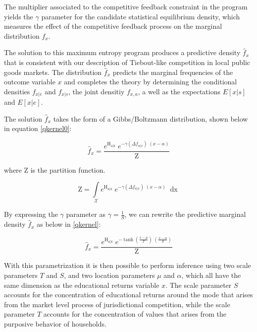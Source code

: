 \medskip


The multiplier associated to the competitive feedback constraint in the program
yields the $\gamma$ parameter for the candidate statistical
equilibrium density, which measures the effect of the competitive
feedback process on the marginal distribution $f_{x}$. 

The solution to this maximum entropy program produces a predictive
density $\hat{f}_{x}$ that is consistent with our 
description of Tiebout-like competition in local public goods
markets. The distribution $\hat{f}_{x}$ predicts the marginal
frequencies of the outcome variable $x$ and completes the theory by
determining the conditional densities $f_{x|e}$ and $f_{x|s}$, the
joint densitiy $f_{x,a}$, a well as the expectations $E[x|s]$ and
$E[x|e]$.

\medskip

The solution $\hat{f}_{x}$ takes the form of a Gibbs/Boltzmann
distribution, shown below in equation \ref{qkernel0}:

\medskip

\begin{equation} \label{qkernel0}
\hat{f}_{x}= \frac{e^{\operatorname{H_{a|x}}}\;e^{-\gamma\left(\Delta f_{a|x}\right)\;(x-\alpha)}}{\mathrm{Z}}
\end{equation}

\medskip


where $\mathrm{Z}$ is the partition function.

\medskip

\begin{equation} \label{partfunc}
\mathrm{Z} = \int \limits_{\mathcal{X}} e^{\operatorname{H_{a|x}}}\;e^{-\gamma\left(\Delta f_{a|x}\right)\;(x-\alpha)}\; \operatorname{dx}
\end{equation}

\medskip

By expressing the $\gamma$ parameter as $\gamma = \frac{1}{S}$, we can
rewrite the predictive marginal density $\hat{f}_{x}$ as below in
\ref{qkernel}:

\begin{equation} \label{qkernel}
\hat{f}_{x}= \frac{e^{\operatorname{H_{a|x}}}\;e^{-\operatorname{tanh}\left( \frac{x-\mu}{T}\right)\;\left(\frac{x-\alpha}{S}\right)}}{\mathrm{Z}}
\end{equation}

\medskip 

\medskip 

With this parametrization it is then possible to perform inference
using two scale parameters $T$ and $S$, and two location parameters
$\mu$ and $\alpha$, which all have the same dimension as the
educational returns variable $x$. The scale parameter $S$ accounts for
the concentration of educational returns around the mode that arises from the
market level process of jurisdictional competition, while the scale
parameter $T$ accounts for the concentration of values that arises
from the purposive behavior of households.

